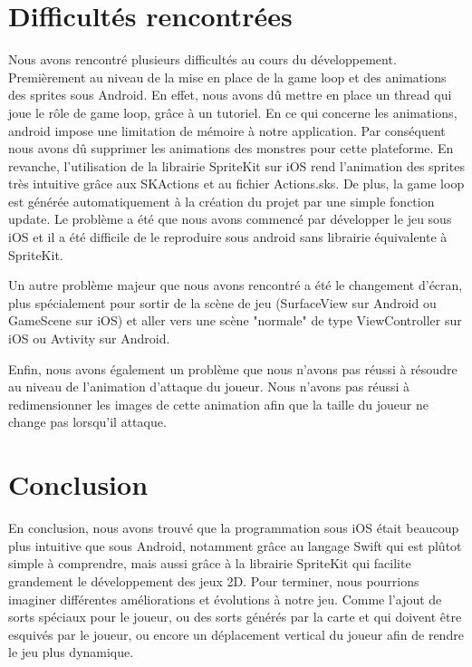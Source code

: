 \documentclass{article}
\begin{document}
\section{Difficultés rencontrées}
\label{section:difficultées}
Nous avons rencontré plusieurs difficultés au cours du développement. Premièrement au niveau de la mise en place de la game loop et des animations des sprites sous Android. En effet, nous avons dû mettre en place un thread qui joue le rôle de game loop, grâce à un tutoriel\cite{tutoGameLoop}. En ce qui concerne les animations, android impose une limitation de mémoire à notre application. Par conséquent nous avons dû supprimer les animations des monstres pour cette plateforme.
En revanche, l'utilisation de la librairie SpriteKit sur iOS rend l'animation des sprites très intuitive grâce aux SKActions et au fichier Actions.sks. De plus, la game loop est générée automatiquement à la création du projet par une simple fonction update.
Le problème a été que nous avons commencé par développer le jeu sous iOS et il a été difficile de le reproduire sous android sans librairie équivalente à SpriteKit.

Un autre problème majeur que nous avons rencontré a été le changement d'écran, plus spécialement pour sortir de la scène de jeu (SurfaceView sur Android ou GameScene sur iOS) et aller vers une scène "normale" de type ViewController sur iOS ou Avtivity sur Android.

Enfin, nous avons également un problème que nous n'avons pas réussi à résoudre au niveau de l'animation d'attaque du joueur. Nous n'avons pas réussi à redimensionner les images de cette animation afin que la taille du joueur ne change pas lorsqu'il attaque.

\section{Conclusion}
\label{section:conclusion}

En conclusion, nous avons trouvé que la programmation sous iOS était beaucoup plus intuitive que sous Android, notamment grâce au langage Swift qui est plûtot simple à comprendre, mais aussi grâce à la librairie SpriteKit qui facilite grandement le développement des jeux 2D.
Pour terminer, nous pourrions imaginer différentes améliorations et évolutions à notre jeu. Comme l'ajout de sorts spéciaux pour le joueur, ou des sorts générés par la carte et qui doivent être esquivés par le joueur, ou encore un déplacement vertical du joueur afin de rendre le jeu plus dynamique.



\end{document}
